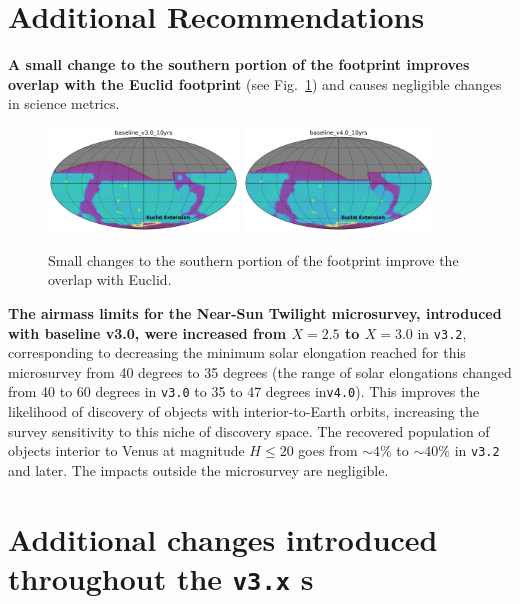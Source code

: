 \section{Additional Recommendations}\label{sec:additional}

{\bf A small change to the southern portion of the footprint improves overlap with the Euclid footprint} (see Fig.~\ref{fig:euclid-overlap}) and causes negligible changes in science metrics. 
\begin{figure}
\centering
\includegraphics[width=0.45\textwidth]{figures/baseline_v3_0_10yrs_euclid_overlap.png}
\includegraphics[width=0.45\textwidth]{figures/baseline_v4_0_10yrs_euclid_overlap.png}

\caption{Small changes to the southern portion of the footprint improve the overlap with Euclid. \label{fig:euclid-overlap}}
\end{figure}

{\bf The airmass limits for the Near-Sun Twilight microsurvey, introduced with baseline v3.0, were increased from $X=2.5$ to $X=3.0$} in \texttt{v3.2}, corresponding to decreasing the minimum solar elongation reached for this microsurvey from 40 degrees to 35 degrees (the range of solar elongations changed from 40 to 60 degrees in \texttt{v3.0} to 35 to 47 degrees in\texttt{v4.0}). This improves the likelihood of discovery of objects with interior-to-Earth orbits, increasing the survey sensitivity to this niche of discovery space. The recovered population of objects
interior to Venus at magnitude $H\leq20$ goes from $\sim4\%$ to $\sim40\%$ in \texttt{v3.2} and later. The impacts outside the microsurvey are negligible.

\clearpage

\section{Additional changes introduced throughout the \texttt{v3.x} \opsim s } \label{sec:opsimchanges}

